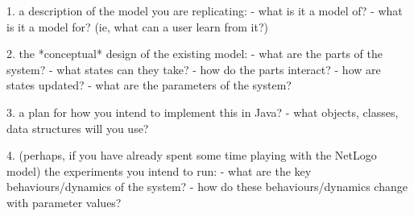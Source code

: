 1. a description of the model you are replicating:
    - what is it a model of?
    - what is it a model for? (ie, what can a user learn from it?)

2. the *conceptual* design of the existing model:
    - what are the parts of the system?
    - what states can they take?
    - how do the parts interact?
    - how are states updated?
    - what are the parameters of the system?

3. a plan for how you intend to implement this in Java?
    - what objects, classes, data structures will you use?

4. (perhaps, if you have already spent some time playing with the NetLogo model) the experiments you intend to run:
    - what are the key behaviours/dynamics of the system?
    - how do these behaviours/dynamics change with parameter values?